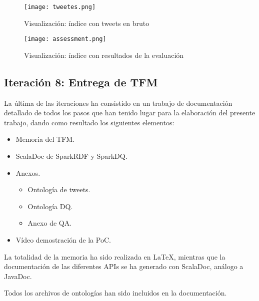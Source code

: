 \begin{figure}[!h]
  \begin{center}
    \texttt{[image: tweetes.png]} 
    \caption{Visualización: índice con tweets en bruto}
    \label{fig:es-twitter}
  \end{center}
\end{figure}

\begin{figure}[!h]
  \begin{center}
    \texttt{[image: assessment.png]} 
    \caption{Visualización: índice con resultados de la evaluación}
    \label{fig:es-assessment}
  \end{center}
\end{figure}



\subsection{Iteración 8: Entrega de TFM}



La última de las iteraciones ha consistido en un trabajo de documentación
detallado de todos los pasos que han tenido lugar para la elaboración del
presente trabajo, dando como resultado los siguientes elementos: 

\begin{itemize}
\item Memoria del \acs{TFM}.
\item ScalaDoc de SparkRDF y SparkDQ.
\item Anexos.
  \begin{itemize}
  \item Ontología de tweets.
  \item Ontología \acs{DQ}.
  \item Anexo de \acs{QA}.
  \end{itemize}
\item Vídeo demostración de la \acs{PoC}.
\end{itemize}

La totalidad de la memoria ha sido realizada en \LaTeX, mientras que la
documentación de las diferentes \acs{API}s se ha generado con ScalaDoc, análogo
a JavaDoc. 

Todos los archivos de ontologías han sido incluidos en la documentación. 
